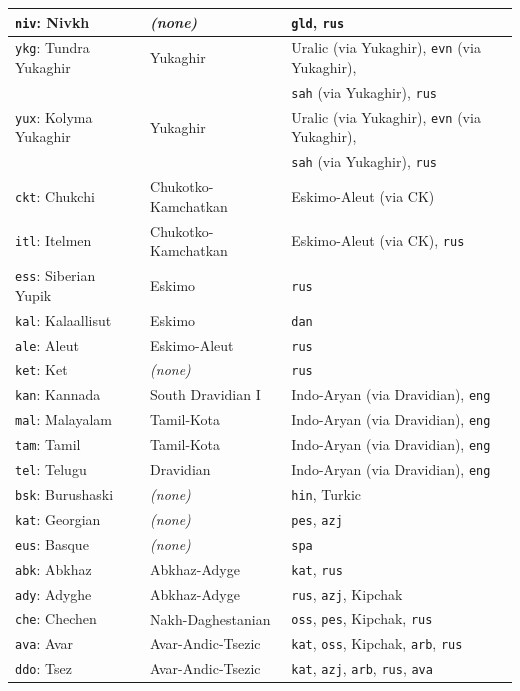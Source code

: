 \begin{center}
\begin{longtable}{lll}
\texttt{niv}: Nivkh & \textit{(none)} & \texttt{gld}, \texttt{rus}\\
\hline
\texttt{ykg}: Tundra Yukaghir & Yukaghir & Uralic (via Yukaghir), \texttt{evn} (via Yukaghir),\\ & & \texttt{sah} (via Yukaghir), \texttt{rus}\\
\texttt{yux}: Kolyma Yukaghir & Yukaghir & Uralic (via Yukaghir), \texttt{evn} (via Yukaghir),\\ & & \texttt{sah} (via Yukaghir), \texttt{rus}\\
\hline
\texttt{ckt}: Chukchi & Chukotko-Kamchatkan & Eskimo-Aleut (via CK)\\
\texttt{itl}: Itelmen & Chukotko-Kamchatkan & Eskimo-Aleut (via CK), \texttt{rus}\\
\hline
\texttt{ess}: Siberian Yupik & Eskimo & \texttt{rus}\\
\texttt{kal}: Kalaallisut & Eskimo & \texttt{dan}\\
\texttt{ale}: Aleut & Eskimo-Aleut & \texttt{rus}\\
\hline
\texttt{ket}: Ket & \textit{(none)} & \texttt{rus}\\
\hline
\texttt{kan}: Kannada & South Dravidian I & Indo-Aryan (via Dravidian), \texttt{eng}\\
\texttt{mal}: Malayalam & Tamil-Kota & Indo-Aryan (via Dravidian), \texttt{eng}\\
\texttt{tam}: Tamil & Tamil-Kota & Indo-Aryan (via Dravidian), \texttt{eng}\\
\texttt{tel}: Telugu & Dravidian & Indo-Aryan (via Dravidian), \texttt{eng}\\
\hline
\texttt{bsk}: Burushaski & \textit{(none)} & \texttt{hin}, Turkic\\
\hline
\texttt{kat}: Georgian & \textit{(none)} & \texttt{pes}, \texttt{azj}\\
\hline
\texttt{eus}: Basque & \textit{(none)} & \texttt{spa}\\
\hline
\texttt{abk}: Abkhaz & Abkhaz-Adyge & \texttt{kat}, \texttt{rus}\\
\texttt{ady}: Adyghe & Abkhaz-Adyge & \texttt{rus}, \texttt{azj}, Kipchak\\
\hline
\texttt{che}: Chechen & Nakh-Daghestanian & \texttt{oss}, \texttt{pes}, Kipchak, \texttt{rus}\\
\texttt{ava}: Avar & Avar-Andic-Tsezic & \texttt{kat}, \texttt{oss}, Kipchak, \texttt{arb}, \texttt{rus}\\
\texttt{ddo}: Tsez & Avar-Andic-Tsezic & \texttt{kat}, \texttt{azj}, \texttt{arb}, \texttt{rus}, \texttt{ava}\\

\end{longtable}
\end{center}

